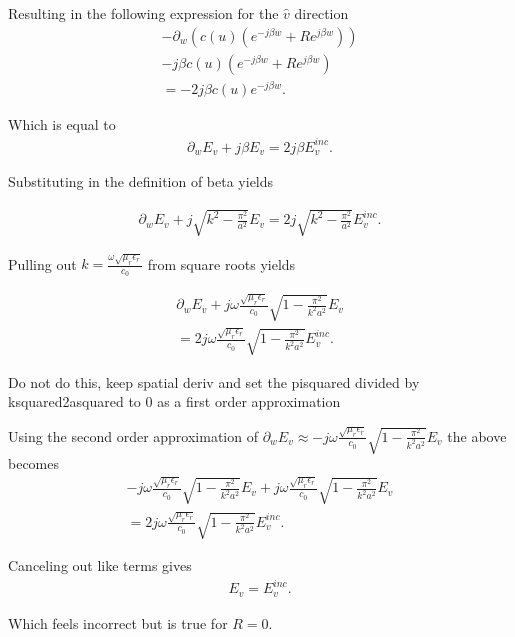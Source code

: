 Resulting in the following expression for the $\hat{v}$ direction
\begin{multline}
    -\partial_w(c(u)(e^{-j\beta w}+Re^{j\beta w})) \\ - j\beta c(u)(e^{-j\beta w}+Re^{j\beta w}) \\ =-2j\beta c(u)e^{-j\beta w}.
\end{multline}

Which is equal to
\begin{align}
    \partial_w E_v+j\beta E_v =2j\beta E_v^{inc}.
\end{align}

Substituting in the definition of beta yields

\begin{align}
    \partial_w E_v+j\sqrt{k^2-\frac{\pi^2}{a^2}} E_v =2j\sqrt{k^2-\frac{\pi^2}{a^2}} E_v^{inc}.
\end{align}

Pulling out $k=\frac{\omega\sqrt{\mu_r\epsilon_r}}{c_0}$ from square roots yields

\begin{multline}
    \partial_w E_v+j\omega\frac{\sqrt{\mu_r\epsilon_r}}{c_0}\sqrt{1-\frac{\pi^2}{k^2a^2}} E_v \\ =2j\omega\frac{\sqrt{\mu_r\epsilon_r}}{c_0}\sqrt{1-\frac{\pi^2}{k^2a^2}} E_v^{inc}.
\end{multline}

Do not do this, keep spatial deriv and set the pisquared divided by ksquared2asquared to 0 as a first order approximation

Using the second order approximation of $\partial_w E_v\approx-j\omega\frac{\sqrt{\mu_r\epsilon_r}}{c_0}\sqrt{1-\frac{\pi^2}{k^2a^2}}E_v$ the above becomes
\begin{multline}
    -j\omega\frac{\sqrt{\mu_r\epsilon_r}}{c_0}\sqrt{1-\frac{\pi^2}{k^2a^2}}E_v+j\omega\frac{\sqrt{\mu_r\epsilon_r}}{c_0}\sqrt{1-\frac{\pi^2}{k^2a^2}} E_v \\ =2j\omega\frac{\sqrt{\mu_r\epsilon_r}}{c_0}\sqrt{1-\frac{\pi^2}{k^2a^2}} E_v^{inc}.
\end{multline}

Canceling out like terms gives
\begin{align}
    E_v = E_v^{inc}.
\end{align}

Which feels incorrect but is true for $R=0$.